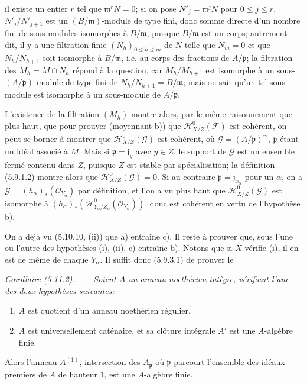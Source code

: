 \documentclass[10pt,oneside]{book}
\makeatletter
\newcommand{\oldpage}[2][]{%
  \setcounter{footnote}{0}%
  \marginpar{\scriptsize\textbf{#1}~|~#2}\ignorespaces}
\newenvironment{corollary}[1][]{%
  \par\medskip\noindent\itshape Corollaire (#1). ---\ }{\par}
\newcommand{\EGAReaderTarget}[2]{\hypertarget{#1}{}\@bsphack\begingroup\def\@currentHref{#1}\label{#2}\endgroup\@esphack}
\makeatother
\begin{document}
\oldpage[IV-2]{123}

il existe un entier $r$ tel que $\mathfrak m^rN=0$; si on pose
$N'_j=\mathfrak m^jN$ pour $0\leq j\leq r$, $N'_j/N'_{j+1}$ est un
$(B/\mathfrak m)$-module de type fini, donc somme directe d'un nombre fini de
sous-modules isomorphes à $B/\mathfrak m$, puisque $B/\mathfrak m$ est un
corps; autrement dit, il y a une filtration finie $(N_h)_{0\leq h\leq m}$ de
$N$ telle que $N_m=0$ et que $N_h/N_{h+1}$ soit isomorphe à
$B/\mathfrak m$, i.e. au corps des fractions de $A/\mathfrak p$; la
filtration des $M_h=M\cap N_h$ répond à la question, car $M_h/M_{h+1}$ est
isomorphe à un sous-$(A/\mathfrak p)$-module de type fini de
$N_h/N_{h+1}=B/\mathfrak m$; mais on sait qu'un tel sous-module est isomorphe
à un sous-module de $A/\mathfrak p$.

L'existence de la filtration $(M_h)$ montre alors, par le même raisonnement que
plus haut, que pour prouver (moyennant b)) que
$\mathcal H^0_{X/Z}(\mathcal F)$ est cohérent, on peut se borner à montrer que
$\mathcal H^0_{X/Z}(\mathcal G)$ est cohérent, où
$\mathcal G=(A/\mathfrak p)^\sim$, $\mathfrak p$ étant un idéal associé à
$M$. Mais si $\mathfrak p=\mathfrak j_y$ avec $y\in Z$, le support de
$\mathcal G$ est un ensemble fermé contenu dans $Z$, puisque $Z$ est stable
par spécialisation; la définition (5.9.1.2) montre alors que
$\mathcal H^0_{X/Z}(\mathcal G)=0$. Si au contraire
$\mathfrak p=\mathfrak j_{x_\alpha}$ pour un $\alpha$, on a
$\mathcal G=(h_\alpha)_*(\mathcal O_{Y_\alpha})$ par définition, et l'on a vu
plus haut que $\mathcal H^0_{X/Z}(\mathcal G)$ est isomorphe à
$(h_\alpha)_*(\mathcal H^0_{Y_\alpha/Z_\alpha}(\mathcal O_{Y_\alpha}))$,
donc est cohérent en vertu de l'hypothèse b).

On a déjà vu (5.10.10, (ii)) que a) entraîne c). Il reste à prouver que, sous
l'une ou l'autre des hypothèses (i), (ii), c) entraîne b). Notons que si $X$
vérifie (i), il en est de même de chaque $Y_\alpha$. Il suffit donc (5.9.3.1)
de prouver le

\begin{corollary}[5.11.2]
\EGAReaderTarget{ega4.c04.cor.5-11-2}{IV.2.s5.11.2-fr}
Soient $A$ un anneau noethérien intègre, vérifiant l'une des deux hypothèses
suivantes:
\begin{enumerate}
\item[(i)] $A$ est quotient d'un anneau noethérien régulier.
\item[(ii)] $A$ est universellement caténaire, et sa clôture intégrale $A'$ est
une $A$-algèbre finie.
\end{enumerate}
Alors l'anneau $A^{(1)}$, intersection des $A_\mathfrak p$ où $\mathfrak p$
parcourt l'ensemble des idéaux premiers de $A$ de hauteur 1, est une
$A$-algèbre finie.
\end{corollary}
\end{document}
